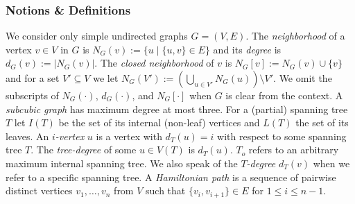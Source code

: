 \documentclass{llncs}
\begin{document}
\subsubsection{Notions \& Definitions}
We consider only simple undirected graphs $G=(V,E)$. The \emph{neighborhood} of a vertex $v\in V$ in $G$ is $N_G(v):=\{u \mid \{u,v\} \in E\}$ and its \emph{degree} is $d_G(v):=|N_G(v)|$. The \emph{closed neighborhood} of $v$ is $N_G[v]:=N_G(v) \cup \{v\}$ and for a set $V' \subseteq V$ we let $N_G(V'):=\left(\bigcup_{u \in V'}N_G(u)\right) \setminus V'$.
We omit the subscripts of $N_G(\cdot)$, $d_G(\cdot)$, and $N_G[\cdot]$ when $G$ is clear from the context.
A \emph{subcubic graph} has maximum degree at most three. 
For a (partial) spanning tree $T$ let $I(T)$ be the set of its internal (non-leaf) vertices and $L(T)$ the set of its leaves. An \emph{$i$-vertex} $u$ is a vertex with $d_T(u)=i$ with respect to some spanning tree $T$. The \emph{tree-degree} of some $u \in V(T)$ is $d_T(u)$. $T_o$ refers to an arbitrary maximum internal spanning tree. We also speak of the \emph{$T$-degree} $d_T(v)$ when we refer to a specific spanning tree. A \emph{Hamiltonian path} is a sequence of pairwise distinct vertices $v_1,\ldots ,v_n$ from $V$ such that $\{v_i,v_{i+1}\} \in E$ for $1 \le i \le n-1$.
\end{document}
